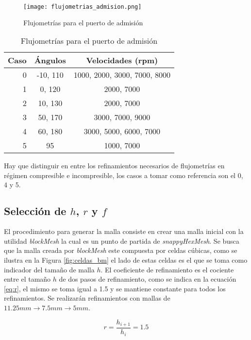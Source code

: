 
\begin{sidewaysfigure}
    \texttt{[image: flujometrias\_admision.png]}
    \caption{Flujometrías para el puerto de admisión}
    \label{fig:flujometrias}
\end{sidewaysfigure}

\begin{table}
    \centering
    \begin{tabular}{rcc} \toprule
        Caso & Ángulos & Velocidades (rpm) \\ \midrule
        0 & -10, 110 & 1000, 2000, 3000, 7000, 8000\\
        1 & 0, 120 & 2000, 7000\\
        2 & 10, 130 & 2000, 7000\\
        3 & 50, 170 & 3000, 7000, 9000\\
        4 & 60, 180 & 3000, 5000, 6000, 7000\\
        5 & 95 & 1000, 7000\\ \bottomrule
    \end{tabular}
    \caption{Flujometrías para el puerto de admisión}
    \label{tab:casos}
\end{table}

Hay que distinguir en entre los refinamientos necesarios de flujometrías en
régimen compresible e incompresible, los casos a tomar como referencia son el
0, 4 y 5.

\subsection{Selección de $h$, $r$ y $f$}
%
El procedimiento para generar la malla consiste en crear una malla inicial con
la utilidad \emph{blockMesh} la cual es un punto de partida de
\emph{snappyHexMesh}.
%
Se busca que la malla creada por \emph{blockMesh} este compuesta por celdas
cúbicas, como se ilustra en la Figura \ref{fig:celdas_bm} el lado de estas
celdas es el que se toma como indicador del tamaño de malla $h$.
%
El coeficiente de refinamiento es el cociente entre el tamaño $h$ de dos pasos
de refinamiento, como se indica en la ecuación \ref{eq:r}, el mismo se toma
igual a 1.5 y se mantiene constante para todos los refinamientos.
%
Se realizarán refinamientos con mallas de $11.25mm \rightarrow 7.5mm
\rightarrow 5mm$.

\begin{equation}
    \label{eq:r}
    r = \frac{h_{i+1}}{h_{i}} = 1.5
\end{equation}


